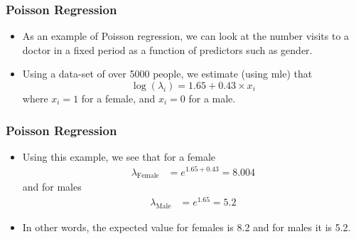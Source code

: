 \documentclass[10pt,xcolor=dvipsnames,serif,professionalfont]{beamer} %
\begin{document}
\begin{frame}
\frametitle{Poisson Regression}
\begin{itemize}
\item As an example of Poisson regression, we can look at the number visits to a doctor in a fixed period as a function of predictors such as gender.
\item Using a data-set of over 5000 people, we estimate (using mle) that 
\[\log(\lambda_i) = 1.65 + 0.43\times x_i \]
where $x_i=1$ for a female, and $x_i=0$ for a male.
\end{itemize}
\end{frame}


\begin{frame}
\frametitle{Poisson Regression}
\begin{itemize}
\item Using this example, we see that for a female
\begin{align*}
\lambda_{\text{Female}} &= e^{1.65 + 0.43} = 8.004
\end{align*}
and for males
\begin{align*}
\lambda_{\text{Male}} &= e^{1.65} = 5.2
\end{align*}
\item In other words, the expected value for females is 8.2 and for males it is 5.2.
\end{itemize}
\end{frame}
\end{document}

